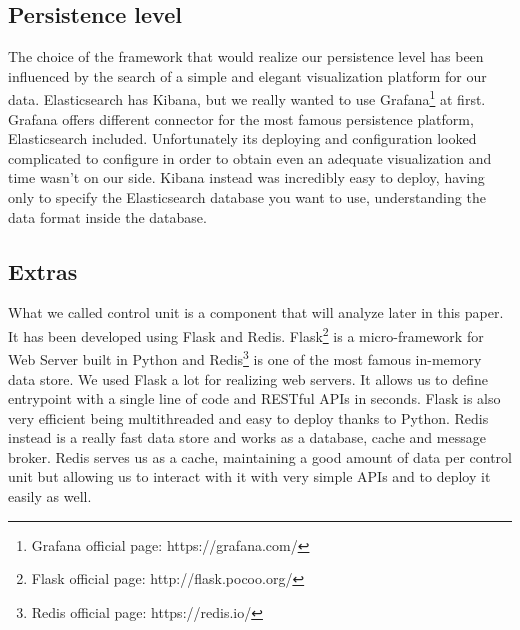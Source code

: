 \subsection{Persistence level}
The choice of the framework that would realize our persistence level has been influenced by the search of a simple and elegant visualization platform for our data. Elasticsearch has Kibana, but we really wanted to use Grafana\footnote{Grafana official page: https://grafana.com/} at first. Grafana offers different connector for the most famous persistence platform, Elasticsearch included. Unfortunately its deploying and configuration looked complicated to configure in order to obtain even an adequate visualization and time wasn't on our side. Kibana instead was incredibly easy to deploy, having only to specify the Elasticsearch database you want to use, understanding the data format inside the database. 

\subsection{Extras}
What we called control unit is a component that will analyze later in this paper. It has been developed using Flask and Redis. Flask\footnote{Flask official page: http://flask.pocoo.org/} is a micro-framework for Web Server built in Python and Redis\footnote{Redis official page: https://redis.io/} is one of the most famous in-memory data store. We used Flask a lot for realizing web servers. It allows us to define entrypoint with a single line of code and RESTful APIs in seconds. Flask is also very efficient being multithreaded and easy to deploy thanks to Python. Redis instead is a really fast data store and works as a database, cache and message broker. Redis serves us as a cache, maintaining a good amount of data per control unit but allowing us to interact with it with very simple APIs and to deploy it easily as well.

